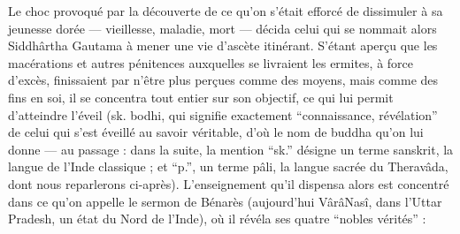 \documentclass[11pt,a4paper]{article} %
\begin{document}
Le choc provoqué par la découverte de ce qu'on s'était efforcé de dissimuler à sa jeunesse dorée --- vieillesse, maladie, mort --- décida celui qui se nommait alors Siddhârtha
Gautama à mener une vie d'ascète itinérant.
S'étant aperçu que les macérations et autres pénitences auxquelles se livraient les ermites, à force d'excès, finissaient par n'être
plus perçues comme des moyens, mais comme des fins en soi, il se concentra tout entier
sur son objectif, ce qui lui permit d'atteindre l'éveil (sk. bodhi, qui signifie exactement
``connaissance, révélation'' de celui qui s'est éveillé au savoir véritable, d'où le nom de
buddha qu'on lui donne --- au passage : dans la suite, la mention ``sk.'' désigne un terme
sanskrit, la langue de l'Inde classique ; et ``p.'', un terme pâli, la langue sacrée du Theravâda, dont nous reparlerons ci-après).
L'enseignement qu'il dispensa alors est
concentré dans ce qu'on appelle le sermon de Bénarès (aujourd'hui VârâNasî, dans
l'Uttar Pradesh, un état du Nord de l'Inde), où il révéla ses quatre ``nobles vérités'' :
\end{document}
